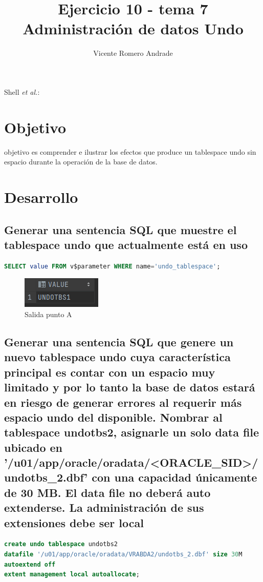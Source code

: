 \documentclass[journal]{IEEEtran}
\begin{document}
\title{Ejercicio 10 - tema 7 \\ Administración de datos Undo}
%
\author{Vicente Romero Andrade}

%
{Shell \MakeLowercase{\textit{et al.}}: }

\maketitle


\IEEEpeerreviewmaketitle

\section{Objetivo}

 objetivo es comprender e ilustrar los efectos que 
produce un tablespace undo sin espacio durante la operación de la base de datos.

\section{Desarrollo}
\subsection{Generar una sentencia SQL que muestre el tablespace undo que actualmente está en uso}
\begin{lstlisting}[language=sql, caption=sentencia consulta tablespace undo,label={lst:codigo1}]
SELECT value FROM v$parameter WHERE name='undo_tablespace';
\end{lstlisting}
\begin{figure}[H]
  \centering
  \includegraphics[scale=.75]{captura_1.png}
   \caption{Salida punto A}
   \label{fig:validador_1}
\end{figure}
\subsection{Generar una sentencia SQL que genere un nuevo tablespace 
undo cuya característica principal es contar con un espacio muy limitado y por lo tanto
la base de datos estará en riesgo de generar errores al requerir más espacio undo del disponible. 
Nombrar al tablespace undotbs2, asignarle un
solo data file ubicado en '/u01/app/oracle/oradata/<ORACLE\_SID>/undotbs\_2.dbf' 
con una capacidad únicamente de 30 MB. El data file no deberá auto extenderse. La administración de sus extensiones debe ser local}
\begin{lstlisting}[language=sql, caption=sentencia generar tablespace undo,label={lst:codigo2}]
create undo tablespace undotbs2
datafile '/u01/app/oracle/oradata/VRABDA2/undotbs_2.dbf' size 30M
autoextend off
extent management local autoallocate;
\end{lstlisting}
\end{document}
